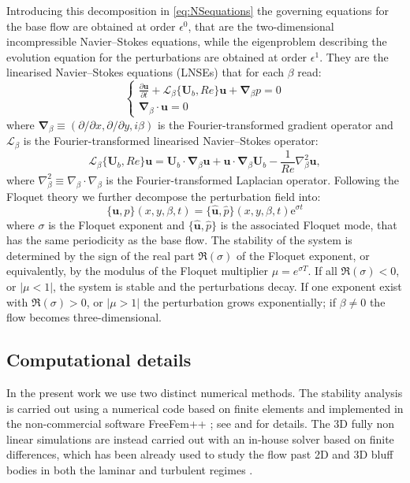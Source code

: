 Introducing this decomposition in \ref{eq:NSequations} the governing equations for the base flow are obtained at order $\epsilon^0$, that are the two-dimensional incompressible Navier--Stokes equations, while the eigenproblem describing the evolution equation for the perturbations are obtained at order $\epsilon^1$. They are the linearised Navier--Stokes equations (LNSEs) that for each $\beta$ read:
%
\begin{equation}
\begin{cases}
\frac{\partial \bm{u}}{\partial t} + \mathcal{L}_\beta\{\bm{U}_b,Re\}\bm{u} + \bm{\nabla}_\beta p = 0 \\
\bm{\nabla}_\beta \cdot \bm{u} = 0
\end{cases}
\label{eq:LNSEs}
\end{equation}
%
where $\bm{\nabla}_\beta \equiv (\partial / \partial x,\partial / \partial y, i\beta)$ is the Fourier-transformed gradient operator and $\mathcal{L}_\beta$ is the Fourier-transformed linearised Navier--Stokes operator:
%
\begin{equation}
\mathcal{L}_\beta\{\bm{U}_b,Re\}\bm{u}=\bm{U}_b \cdot \bm{\nabla}_\beta \bm{u} + \bm{u} \cdot \bm{\nabla}_\beta \bm{U}_b - \frac{1}{Re} \nabla^2_\beta \bm{u},
\end{equation}
%
where $\nabla^2_\beta \equiv \nabla_\beta \cdot \nabla_\beta$ is the Fourier-transformed Laplacian operator. Following the Floquet theory we further decompose the perturbation field into:
%
\begin{equation}
\{\bm{u},p\}(x,y,\beta,t) = \{\hat{\bm{u}},\hat{p}\}(x,y,\beta,t) \text{e}^{\sigma t}
\end{equation}
%
where $\sigma$ is the Floquet exponent and $\{ \hat{\bm{u}},\hat{p} \}$ is the associated Floquet mode, that has the same periodicity as the base flow. The stability of the system is determined by the sign of the real part $\Re(\sigma)$ of the Floquet exponent, or equivalently, by the modulus of the Floquet multiplier $\mu = e^{\sigma T}$. If all $\Re(\sigma)<0$, or $|\mu<1|$, the system is stable and the perturbations decay. If one exponent exist with $\Re(\sigma)>0$, or $|\mu>1|$ the perturbation grows exponentially; if $\beta \neq 0$ the flow becomes three-dimensional.

\subsection{Computational details}

In the present work we use two distinct numerical methods. The stability analysis is carried out using a numerical code based on finite elements and implemented in the non-commercial software FreeFem++ \citep{hecht-2012}; see \cite{chiarini-quadrio-auteri-2022d} and \cite{chiarini-nastro-2025} for details. The 3D fully non linear simulations are instead carried out with an in-house solver based on finite differences, which has been already used to study the flow past 2D and 3D bluff bodies in both the laminar and turbulent regimes \citep{chiarini-quadrio-auteri-2022d,chiarini-boujo-2024,chiarini-etal-2022}.

